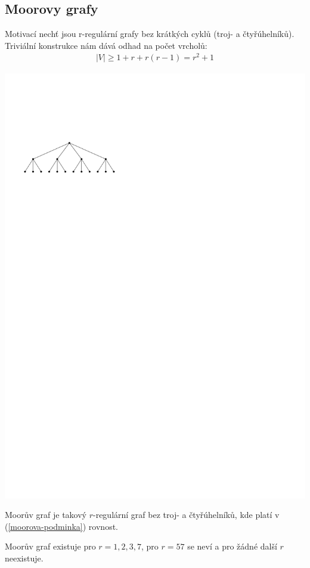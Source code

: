 \subsection{Moorovy grafy}


Motivací nechť jsou r-regulární grafy bez krátkých cyklů (troj- a 
čtyřúhelníků). Triviální konstrukce nám dává odhad na počet vrcholů:
\begin{align}
\label{moorova-podminka}
	|V| \geq 1 + r + r(r-1) = r^2 +1
\end{align}

\begin{center}
\includegraphics{moore.pdf}
\end{center}

\df Moorův graf je takový $r$-regulární graf bez troj- a čtyřúhelníků, kde 
platí v (\ref{moorova-podminka}) rovnost.

\vt Moorův graf existuje pro $r=1,2,3,7$, pro $r=57$ se neví a pro žádné další 
$r$ neexistuje.

